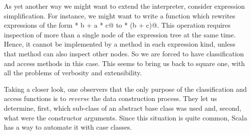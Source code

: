 \documentclass[11pt]{book}
\begin{document}
As yet another way we might want to extend the interpreter, consider
expression simplification. For instance, we might want to write a
function which rewrites expressions of the form
\verb@a * b + a * c@ to \verb@a * (b + c)@. This operation requires inspection of 
more than a single node of the expression tree at the same
time. Hence, it cannot be implemented by a method in each expression
kind, unless that method can also inspect other nodes. So we are
forced to have classification and access methods in this case. This
seems to bring us back to square one, with all the problems of
verbosity and extensibility.

Taking a closer look, one observers that the only purpose of the
classification and access functions is to {\em reverse} the data
construction process.  They let us determine, first, which sub-class
of an abstract base class was used and, second, what were the
constructor arguments. Since this situation is quite common, Scala has
a way to automate it with case classes. 
\end{document}
